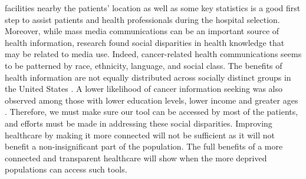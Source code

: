 facilities nearby the patients' location as well as some key statistics is a
good first step to assist patients and health professionals during the hospital
selection. Moreover, while mass media communications can be an important source
of health information, research found social disparities in health knowledge
that may be related to media use. Indeed, cancer-related health communications
seems to be patterned by race, ethnicity, language, and social class. The
benefits of health information are not equally distributed across socially
distinct groups in the United States \cite{viswanath_race_2011}. A lower
likelihood of cancer information seeking was also observed among those with
lower education levels, lower income and greater ages
\cite{finney_rutten_cancer-related_2016}. Therefore, we must make sure our tool
can be accessed by most of the patients, and efforts must be made in addressing
these social disparities. Improving healthcare by making it more connected will
not be sufficient as it will not benefit a non-insignificant part of the
population. The full benefits of a more connected and transparent healthcare
will show when the more deprived populations can access such tools.
